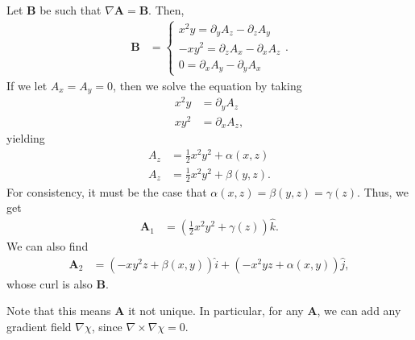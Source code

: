 \documentclass[10pt]{mypackage}
\begin{document}
\begin{example}
  Let $\mathbf{B}$ be such that $\nabla \mathbf{A} = \mathbf{B}$. Then,
  \begin{align*}
    \mathbf{B} &= \begin{cases}
      x^2y = \partial_y A_z - \partial_z A_y\\
      -xy^2 = \partial_z A_x - \partial_x A_z\\
      0 = \partial_x A_y - \partial_y A_x
    \end{cases}.
  \end{align*}
  If we let $A_x = A_y = 0$, then we solve the equation by taking
  \begin{align*}
    x^2 y &= \partial_y A_z\\
    xy^2 &= \partial_xA_z,
  \end{align*}
  yielding
  \begin{align*}
    A_z &= \frac{1}{2}x^2y^2 + \alpha(x,z)\\
    A_z &= \frac{1}{2}x^2y^2 + \beta(y,z).
  \end{align*}
  For consistency, it must be the case that $\alpha(x,z) = \beta(y,z) = \gamma(z)$. Thus, we get
  \begin{align*}
    \mathbf{A}_1 &= \left(\frac{1}{2}x^2y^2 + \gamma(z)\right)\widehat{k}.
  \end{align*}
  We can also find
  \begin{align*}
    \mathbf{A}_2 &= \left(-xy^2z + \beta(x,y)\right)\widehat{i} + \left(-x^2yz + \alpha(x,y)\right)\widehat{j},
  \end{align*}
  whose curl is also $\mathbf{B}$.\newline

  Note that this means $\mathbf{A}$ it not unique. In particular, for any $\mathbf{A}$, we can add any gradient field $\nabla \chi$, since $\nabla \times \nabla \chi = 0$.
\end{example}
\end{document}
